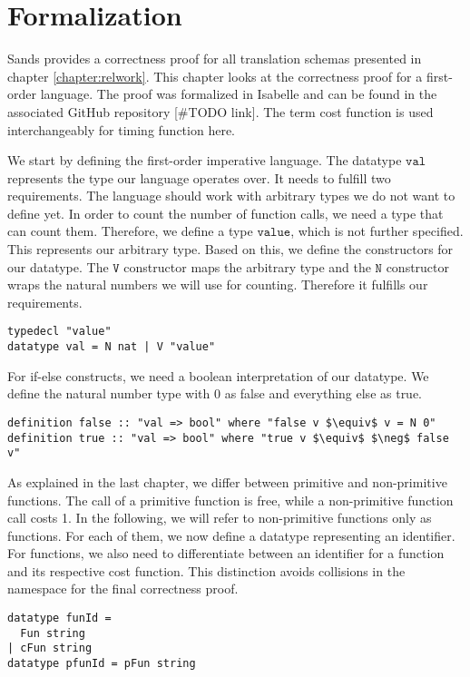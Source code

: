 
\chapter{Formalization}\label{chapter:formal}

Sands provides a correctness proof for all translation schemas presented in chapter \ref{chapter:relwork}.
This chapter looks at the correctness proof for a first-order language.
The proof was formalized in Isabelle and can be found in the associated GitHub repository [\#TODO link].
The term cost function is used interchangeably for timing function here.

We start by defining the first-order imperative language.
The datatype $\texttt{val}$ represents the type our language operates over.
It needs to fulfill two requirements.
The language should work with arbitrary types we do not want to define yet.
In order to count the number of function calls, we need a type that can count them.
Therefore, we define a type $\texttt{value}$, which is not further specified.
This represents our arbitrary type.
Based on this, we define the constructors for our datatype.
The $\texttt{V}$ constructor maps the arbitrary type and the $\texttt{N}$ constructor wraps the natural numbers we will use for counting.
Therefore it fulfills our requirements.
\begin{lstlisting}[language=isabelle]
typedecl "value"
datatype val = N nat | V "value"
\end{lstlisting}

For if-else constructs, we need a boolean interpretation of our datatype.
We define the natural number type with 0 as false and everything else as true.
\begin{lstlisting}[mathescape=true,language=isabelle]
definition false :: "val => bool" where "false v $\equiv$ v = N 0"
definition true :: "val => bool" where "true v $\equiv$ $\neg$ false v"
\end{lstlisting}

As explained in the last chapter, we differ between primitive and non-primitive functions.
The call of a primitive function is free, while a non-primitive function call costs 1.
In the following, we will refer to non-primitive functions only as functions.
For each of them, we now define a datatype representing an identifier.
For functions, we also need to differentiate between an identifier for a function and its respective cost function.
This distinction avoids collisions in the namespace for the final correctness proof.
\begin{lstlisting}[language=isabelle]
datatype funId =
  Fun string
| cFun string
datatype pfunId = pFun string
\end{lstlisting}

